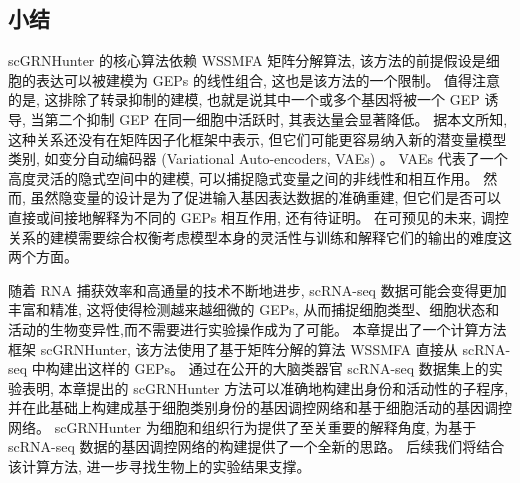 \subsection{小结}
scGRNHunter 的核心算法依赖 WSSMFA 矩阵分解算法,
该方法的前提假设是细胞的表达可以被建模为 GEPs 的线性组合,
这也是该方法的一个限制。
值得注意的是, 这排除了转录抑制的建模, 也就是说其中一个或多个基因将被一个 GEP 诱导,
当第二个抑制 GEP 在同一细胞中活跃时, 其表达量会显著降低。
据本文所知, 这种关系还没有在矩阵因子化框架中表示, 但它们可能更容易纳入新的潜变量模型类别,
如变分自动编码器 (Variational Auto-encoders, VAEs) 。
VAEs 代表了一个高度灵活的隐式空间中的建模, 可以捕捉隐式变量之间的非线性和相互作用。
然而, 虽然隐变量的设计是为了促进输入基因表达数据的准确重建, 
但它们是否可以直接或间接地解释为不同的 GEPs 相互作用, 还有待证明。
在可预见的未来, 调控关系的建模需要综合权衡考虑模型本身的灵活性与训练和解释它们的输出的难度这两个方面。

随着 RNA 捕获效率和高通量的技术不断地进步, scRNA-seq 数据可能会变得更加丰富和精准,
这将使得检测越来越细微的 GEPs, 从而捕捉细胞类型、细胞状态和活动的生物变异性,而不需要进行实验操作成为了可能。
本章提出了一个计算方法框架 scGRNHunter,
该方法使用了基于矩阵分解的算法 WSSMFA 直接从 scRNA-seq 中构建出这样的 GEPs。 
通过在公开的大脑类器官 scRNA-seq 数据集上的实验表明,
本章提出的 scGRNHunter 方法可以准确地构建出身份和活动性的子程序, 
并在此基础上构建成基于细胞类别身份的基因调控网络和基于细胞活动的基因调控网络。
scGRNHunter 为细胞和组织行为提供了至关重要的解释角度,
为基于 scRNA-seq 数据的基因调控网络的构建提供了一个全新的思路。
后续我们将结合该计算方法, 进一步寻找生物上的实验结果支撑。